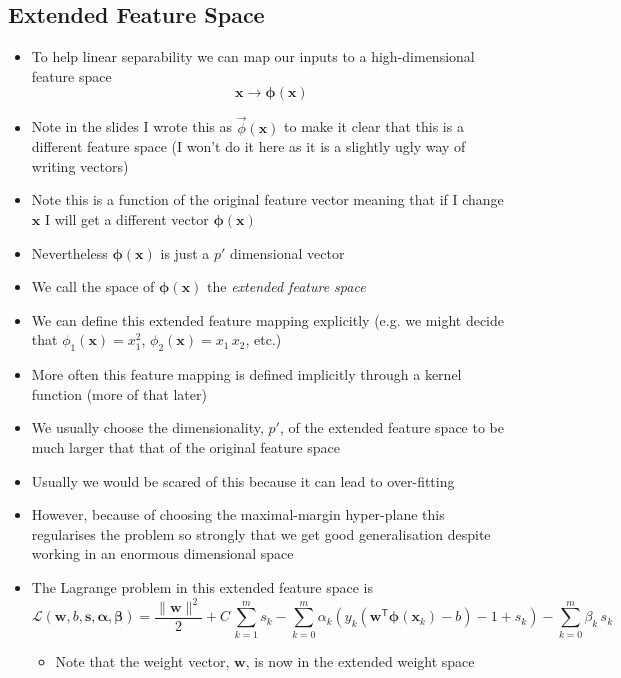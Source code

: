 \documentclass[11pt]{article}
\newcommand{\tr}{\textsf{T}}
\begin{document}
\subsection{Extended Feature Space}
\label{sec:org8333e49}
\begin{itemize}
\item To help linear separability we can map our inputs to a
high-dimensional feature space
$$ \bm{x} \rightarrow \bm{\phi}(\bm{x}) $$
\item Note in the slides I wrote this as \(\vec{\phi}(\bm{x})\) to
make it clear that this is a different feature space (I won't
do it here as it is a slightly ugly way of writing vectors)
\item Note this is a function of the original feature vector
meaning that if I change \(\bm{x}\) I will get a different
vector \(\bm{\phi}(\bm{x})\)
\item Nevertheless \(\bm{\phi}(\bm{x})\) is just a \(p'\) dimensional
vector
\item We call the space of \(\bm{\phi}(\bm{x})\) the \emph{extended
feature space}
\item We can define this extended feature mapping explicitly (e.g. we
might decide that \(\phi_1(\bm{x}) = x_1^2\), \(\phi_2(\bm{x}) =
       x_1\,x_2\), etc.)
\item More often this feature mapping is defined implicitly through
a kernel function (more of that later)
\item We usually choose the dimensionality, \(p'\), of the extended feature
space to be much larger that that of the original feature space
\item Usually we would be scared of this because it can lead to over-fitting
\item However, because of choosing the maximal-margin hyper-plane
this regularises the problem so strongly that we get good
generalisation despite working in an enormous dimensional space
\item The Lagrange problem in this extended feature space is
$$ \mathcal{L}(\bm{w}, b, \bm{s},\bm{\alpha}, \bm{\beta}) =
       \frac{\|\bm{w}\|^2}{2} + C \, \sum_{k=1}^m s_k -  \sum_{k=0}^m
       \alpha_k \left( y_k \left( \bm{w}^\tr \bm{\phi}(\bm{x}_k) - b
       \right) - 1 + s_k \right) - \sum_{k=0}^m   \beta_k \, s_k $$
\begin{itemize}
\item Note that the weight vector, \(\bm{w}\), is now in the extended weight space
\end{itemize}
\end{itemize}
\end{document}
